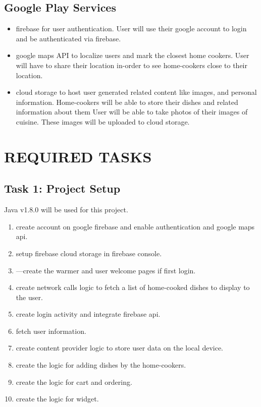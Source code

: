 \documentclass{article}
\begin{document}
\subsection{Google Play Services}
  \begin{itemize}
    \item firebase for user authentication. User will use their google account to login and be authenticated via firebase.
    \item google maps API to localize users and mark the closest home cookers. User will have to share their location in-order to see home-cookers close to their location.
    \item cloud storage to host user generated related content like images, and personal information. Home-cookers will be able to store their dishes and related information about them User will be able to take photos of their images of cuisine. These images will be uploaded to cloud storage.
  \end{itemize}

\section{REQUIRED TASKS}
\subsection{Task 1: Project Setup}
    Java v1.8.0 will be used for this project.
  \begin{enumerate}
    \item create account on google firebase and enable authentication and google maps api.
    \item setup firebase cloud storage in firebase console.
    \item---create the warmer and user welcome pages if first login.
    \item create network calls logic to fetch a list of home-cooked dishes to display to the user.
    \item create login activity and integrate firebase api.
    \item fetch user information.
    \item create content provider logic to store user data on the local device.
    \item create the logic for adding dishes by the home-cookers.
    \item create the logic for cart and ordering.
    \item create the logic for widget.
  \end{enumerate}
\end{document}
